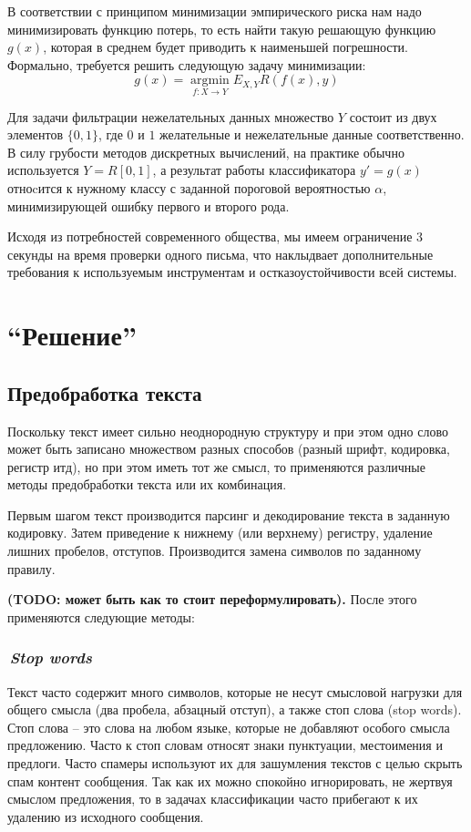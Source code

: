 \documentclass[12pt]{article}
\begin{document}
В соответствии с принципом минимизации эмпирического риска нам надо минимизировать функцию потерь, то есть найти такую решающую функцию $g(x)$, которая в среднем будет приводить к наименьшей погрешности. Формально, требуется решить следующую задачу минимизации:
$$
g(x) = \operatorname*{argmin}_{f: X \rightarrow Y} E_{X,Y} R(f(x), y)
$$

Для задачи фильтрации нежелательных данных множество $Y$ состоит из двух элементов $\{0, 1\}$, где $0$ и $1$ желательные и нежелательные данные соответственно. В силу грубости методов дискретных вычислений, на практике обычно используется $Y = R[0, 1]$, а результат работы классификатора $y' = g(x)$ отноcится к нужному классу с заданной пороговой вероятностью $\alpha$, минимизирующей ошибку первого и второго рода.


Исходя из потребностей современного общества, мы имеем ограничение 3 секунды на время проверки одного письма, что наклыдвает дополнительные требования к используемым инструментам и остказоустойчивости всей системы. 

\section{``Решение''}
\subsection*{Предобработка текста}
Поскольку текст имеет сильно неоднородную структуру и при этом одно слово может быть записано множеством разных способов (разный шрифт, кодировка, регистр итд), но при этом иметь тот же смысл, то применяются различные методы предобработки текста или их комбинация.

Первым шагом текст производится парсинг и декодирование текста в заданную кодировку. Затем приведение к нижнему (или верхнему) регистру, удаление лишних пробелов, отступов. Производится замена символов по заданному правилу.

{\bf\color{amaranth} (TODO: может быть как то стоит переформулировать).}
После этого применяются следующие методы:

\subsubsection*{\it\,Stop words}
Текст часто содержит много символов, которые не несут смысловой нагрузки для общего смысла (два пробела, абзацный отступ), а также стоп слова (stop words).
Стоп слова -- это слова на любом языке, которые не добавляют особого смысла предложению. 	Часто к стоп словам относят знаки пунктуации, местоимения и предлоги. Часто спамеры используют их для зашумления текстов с целью скрыть спам контент сообщения. Так как их можно спокойно игнорировать, не жертвуя смыслом предложения, то в задачах классификации часто прибегают к их удалению из исходного сообщения.
\end{document}
